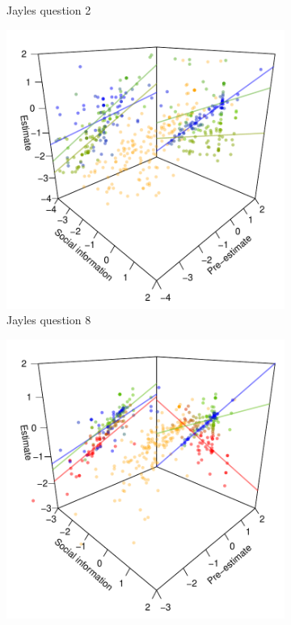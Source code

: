 \documentclass[9pt,twoside,lineno]{pnas-new}
\begin{document}
\begin{figure}[htbp]
\begin{subfigure}[b]{.24\textwidth}
		\caption{Jayles question 2}
	\end{subfigure}
		\begin{subfigure}[b]{.24\textwidth}
		\includegraphics[width=\textwidth]{../plots/jayles8_vs_xp3d.pdf}
		\caption{Jayles question 8}
	\end{subfigure}
	\begin{subfigure}[b]{.24\textwidth}
		\includegraphics[width=\textwidth]{../plots/jayles10_vs_xp3d.pdf}

\end{subfigure}
\end{figure}
\end{document}
